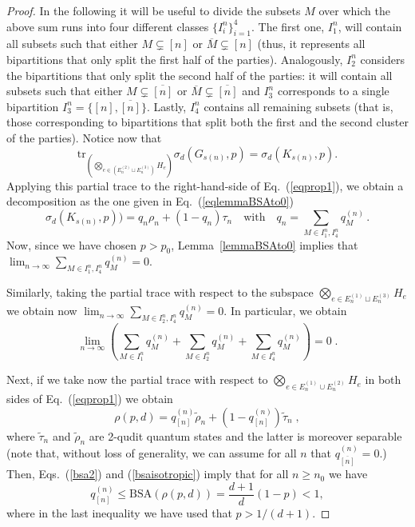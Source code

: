 \documentclass[a4paper,onecolumn,accepted=2024-12-14]{quantumarticle}
\theoremstyle{plain}
\def\tr{\mathrm{tr}}
\newcommand{\quadtext}[1]{\quad\text{#1}\quad}
\begin{document}
\begin{proof}
In the following it will be useful to divide the subsets $M$ over which the above sum runs into four different classes $\{I_i^n\}_{i=1}^4$. The first one,
$I_1^n$, will contain all subsets such that either $M\subsetneq[n]$ or $\overline{M}\subsetneq[n]$ (thus, it represents all bipartitions that only split the first half of the parties). Analogously, $I_2^n$ considers the bipartitions that only split the second half of the parties: it will contain all subsets such that either $M\subsetneq\overline{[n]}$ or $\overline{M}\subsetneq\overline{[n]}$ and $I_3^n$ corresponds to a single bipartition $I_3^n=\{[n],\overline{[n]}\}$. Lastly, $I_4^n$ contains all remaining subsets (that is, those corresponding to bipartitions that split both the first and the second cluster of the parties). Notice now that
\begin{equation}
    \tr_{\left(\bigotimes_{e\in \left(E_n^{(2)}\sqcup E_n^{(3)}\right)}H_e\right)}\sigma_d(G_{s(n)},p)=\sigma_d(K_{s(n)},p).
\end{equation}
Applying this partial trace to the right-hand-side of Eq.~(\ref{eqprop1}), we obtain a decomposition as the one given in Eq.~(\ref{eqlemmaBSAto0})
\begin{equation}
\sigma_d(K_{s(n)},p))=q_n\rho_n+(1-q_n)\tau_n
\quadtext{with}
q_n=\sum_{M\in I_1^n,I_4^n}q_M^{(n)}\,.
\end{equation}
Now, since we have chosen $p>p_0$, Lemma~\ref{lemmaBSAto0} implies that
$\lim_{n\to\infty}\sum_{M\in I_1^n,I_4^n}q_M^{(n)}=0$.


Similarly, taking the partial trace with respect to the subspace
$\bigotimes_{e\in E_n^{(1)}\sqcup E_n^{(3)}}H_e$ we obtain now
$\lim_{n\to\infty}\sum_{M\in I_2^n,I_4^n}q_M^{(n)}=0$. In particular, we obtain
\begin{equation}\label{eq:I}
 \lim_{n\to\infty}
  \left(
  \sum_{M\in I_1^n}q_M^{(n)}+\sum_{M\in I_2^n}q_M^{(n)}+\sum_{M\in I_4^n}q_M^{(n)}
  \right)=0\;.
\end{equation}

Next, if we take now the partial trace with respect to $\bigotimes_{e\in E_n^{(1)}\cup E_n^{(2)}}H_e$ in both sides of Eq.~(\ref{eqprop1}) we obtain
\begin{equation}
\rho(p,d)=q_{[n]}^{(n)}\tilde{\rho}_n+\left(1-q_{[n]}^{(n)}\right)\tilde{\tau}_n\;,
\end{equation}
where $\tilde\tau_n$ and $\tilde\rho_n$ are 2-qudit quantum states and the latter is moreover separable (note that, without loss of generality, we can assume for all $n$ that $q_{\overline{[n]}}^{(n)}=0$.)
Then, Eqs.~(\ref{bsa2}) and (\ref{bsaisotropic}) imply that for all $n\geq n_0$ we have
\begin{equation}\label{eq:M0}
q_{[n]}^{(n)}\leq \mathrm{BSA}(\rho(p,d))=\frac{d+1}{d}(1-p)
<1,
\end{equation}where in the last inequality we have used that $p>1/(d+1)$.


\end{proof}
\end{document}
